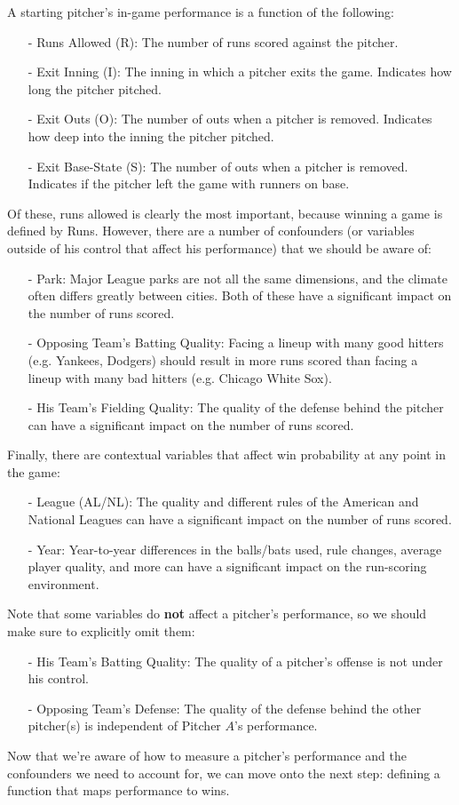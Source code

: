 \documentclass[twoside]{article}
\theoremstyle{definition}
\begin{document}
A starting pitcher's in-game performance is a function of the following:
\begin{itemize}
    \item[-] Runs Allowed (R): The number of runs scored against the pitcher.
    \item[-] Exit Inning (I): The inning in which a pitcher exits the game. Indicates how long the pitcher pitched.
    \item[-] Exit Outs (O): The number of outs when a pitcher is removed. Indicates how deep into the inning the pitcher pitched.
    \item[-] Exit Base-State (S): The number of outs when a pitcher is removed. Indicates if the pitcher left the game with runners on base.
\end{itemize}
Of these, runs allowed is clearly the most important, because winning a game is defined by Runs. However, there are a number of confounders (or variables outside of his control that affect his performance) that we should be aware of:
\begin{itemize}
    \item[-] Park: Major League parks are not all the same dimensions, and the climate often differs greatly between cities. Both of these have a significant impact on the number of runs scored.
    \item[-] Opposing Team's Batting Quality: Facing a lineup with many good hitters (e.g. Yankees, Dodgers) should result in more runs scored than facing a lineup with many bad hitters (e.g. Chicago White Sox).
    \item[-] His Team's Fielding Quality: The quality of the defense behind the pitcher can have a significant impact on the number of runs scored.
\end{itemize}
Finally, there are contextual variables that affect win probability at any point in the game:
\begin{itemize}
    \item[-] League (AL/NL): The quality and different rules of the American and National Leagues can have a significant impact on the number of runs scored.
    \item[-] Year: Year-to-year differences in the balls/bats used, rule changes, average player quality, and more can have a significant impact on the run-scoring environment.
\end{itemize}
Note that some variables do \textbf{not} affect a pitcher's performance, so we should make sure to explicitly omit them:
\begin{itemize}
    \item[-] His Team's Batting Quality: The quality of a pitcher's offense is not under his control.
    \item[-] Opposing Team's Defense: The quality of the defense behind the other pitcher(s) is independent of Pitcher $A$'s performance.
\end{itemize}
Now that we're aware of how to measure a pitcher's performance and the confounders we need to account for, we can move onto the next step: defining a function that maps performance to wins.
\end{document}
